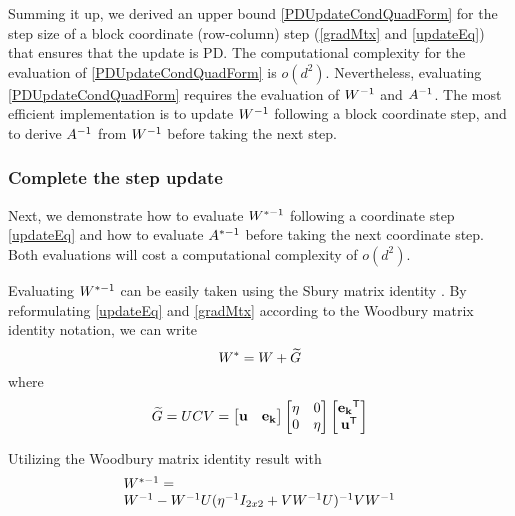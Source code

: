 \documentclass{article}
\begin{document}
Summing it up, we derived an upper bound \eqref{PDUpdateCondQuadForm} for the step size of a block coordinate (row-column) step (\eqref{gradMtx} and \eqref{updateEq}) that ensures that the update is PD. The computational complexity for the evaluation of \eqref{PDUpdateCondQuadForm} is $o(d^2)$. Nevertheless, evaluating \eqref{PDUpdateCondQuadForm} requires the evaluation of ${W}^{-1}$ and ${A}^{-1}$. The most efficient implementation is to update ${W}^{-1}$ following a block coordinate step, and to derive ${A}^{-1}$ from ${W}^{-1}$ before taking the next step. 

\subsubsection{Complete the step update}

Next, we demonstrate how to evaluate ${W}^{*-1}$ following a coordinate step \eqref{updateEq} and how to evaluate ${A}^{*-1}$ before taking the next coordinate step. Both evaluations will cost a computational complexity of $o(d^2)$.

Evaluating ${W}^{*-1}$ can be easily taken using the Sbury matrix identity . By reformulating \eqref{updateEq} and \eqref{gradMtx} according to the Woodbury matrix identity notation, we can write
\begin{equation}
{W^*} = {W}+{\widetilde{G}}
\label{updateEqWDB}
\end{equation}
where
\begin{equation}
{\widetilde{G}} = {U}{C}{V} = \left[ \begin{matrix} \mathbf{u} & \mathbf{e_k} \end{matrix} \right] \left[ \begin{matrix} \eta & 0 \\ 0 & \eta \end{matrix} \right] \left[ \begin{matrix} \mathbf{e_k}{}^\mathsf{T} \\ \mathbf{u}{}^\mathsf{T} \end{matrix} \right]
\label{gradMtxWDB}
\end{equation}

Utilizing the Woodbury matrix identity result with
\begin{equation}
\begin{array}{lcl}
{W}^{*-1} = \\
{W}^{-1} - {W}^{-1} {U} (\eta^{-1} I_{2x2} + {V} {W}^{-1} {U})^{-1} {V} {W}^{-1}
\end{array}
\label{InvWwdb}
\end{equation}
\end{document}
